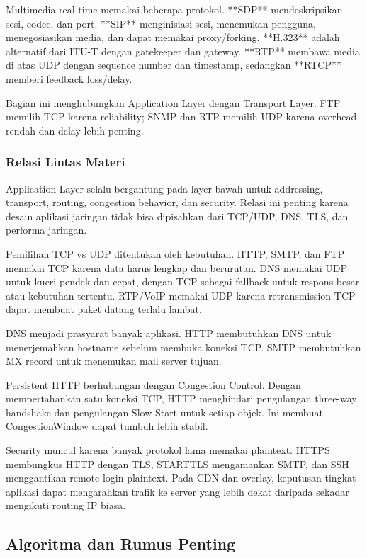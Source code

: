 Multimedia real-time memakai beberapa protokol. **SDP** mendeskripsikan sesi, codec, dan port. **SIP** menginisiasi sesi, menemukan pengguna, menegosiasikan media, dan dapat memakai proxy/forking. **H.323** adalah alternatif dari ITU-T dengan gatekeeper dan gateway. **RTP** membawa media di atas UDP dengan sequence number dan timestamp, sedangkan **RTCP** memberi feedback loss/delay.

Bagian ini menghubungkan Application Layer dengan Transport Layer. FTP memilih TCP karena reliability; SNMP dan RTP memilih UDP karena overhead rendah dan delay lebih penting.

\subsubsection{Relasi Lintas Materi}
\begin{jawab}
Application Layer selalu bergantung pada layer bawah untuk addressing, transport, routing, congestion behavior, dan security. Relasi ini penting karena desain aplikasi jaringan tidak bisa dipisahkan dari TCP/UDP, DNS, TLS, dan performa jaringan.
\end{jawab}

Pemilihan TCP vs UDP ditentukan oleh kebutuhan. HTTP, SMTP, dan FTP memakai TCP karena data harus lengkap dan berurutan. DNS memakai UDP untuk kueri pendek dan cepat, dengan TCP sebagai fallback untuk respons besar atau kebutuhan tertentu. RTP/VoIP memakai UDP karena retransmission TCP dapat membuat paket datang terlalu lambat.

DNS menjadi prasyarat banyak aplikasi. HTTP membutuhkan DNS untuk menerjemahkan hostname sebelum membuka koneksi TCP. SMTP membutuhkan MX record untuk menemukan mail server tujuan.

Persistent HTTP berhubungan dengan Congestion Control. Dengan mempertahankan satu koneksi TCP, HTTP menghindari pengulangan three-way handshake dan pengulangan Slow Start untuk setiap objek. Ini membuat CongestionWindow dapat tumbuh lebih stabil.

Security muncul karena banyak protokol lama memakai plaintext. HTTPS membungkus HTTP dengan TLS, STARTTLS mengamankan SMTP, dan SSH menggantikan remote login plaintext. Pada CDN dan overlay, keputusan tingkat aplikasi dapat mengarahkan trafik ke server yang lebih dekat daripada sekadar mengikuti routing IP biasa.

\subsection{Algoritma dan Rumus Penting}

